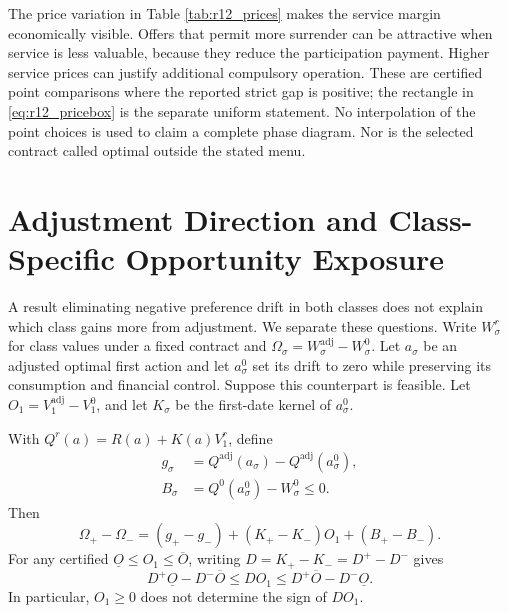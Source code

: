 

The price variation in Table \ref{tab:r12_prices} makes the service margin economically visible. Offers that permit more surrender can be attractive when service is less valuable, because they reduce the participation payment. Higher service prices can justify additional compulsory operation. These are certified point comparisons where the reported strict gap is positive; the rectangle in \eqref{eq:r12_pricebox} is the separate uniform statement. No interpolation of the point choices is used to claim a complete phase diagram. Nor is the selected contract called optimal outside the stated menu.

\section{Adjustment Direction and Class-Specific Opportunity Exposure}
\label{sec:r12_mechanism}
A result eliminating negative preference drift in both classes does not explain which class gains more from adjustment. We separate these questions. Write $W^r_\sigma$ for class values under a fixed contract and $\Omega_\sigma=W^{\mathrm{adj}}_\sigma-W^0_\sigma$. Let $a_\sigma$ be an adjusted optimal first action and let $a_\sigma^0$ set its drift to zero while preserving its consumption and financial control. Suppose this counterpart is feasible. Let $O_1=V^{\mathrm{adj}}_1-V^0_1$, and let $K_\sigma$ be the first-date kernel of $a_\sigma^0$.

\begin{proposition}
\label{prop:r12_exposure}
With $Q^r(a)=R(a)+K(a)V^r_1$, define
\begin{align}
 g_\sigma&=Q^{\mathrm{adj}}(a_\sigma)-Q^{\mathrm{adj}}(a_\sigma^0),\\
 B_\sigma&=Q^0(a_\sigma^0)-W^0_\sigma\leq0.
\end{align}
Then
\begin{equation}
 \Omega_+-\Omega_-=(g_+-g_-)+(K_+-K_-)O_1+(B_+-B_-).
 \label{eq:r12_exposure}
\end{equation}
For any certified $\underline O\leq O_1\leq\overline O$, writing $D=K_+-K_-=D^+-D^-$ gives
\begin{equation}
 D^+\underline O-D^-\overline O\leq DO_1
 \leq D^+\overline O-D^-\underline O.
 \label{eq:r12_signed_exposure}
\end{equation}
In particular, $O_1\geq0$ does not determine the sign of $DO_1$.
\end{proposition}

